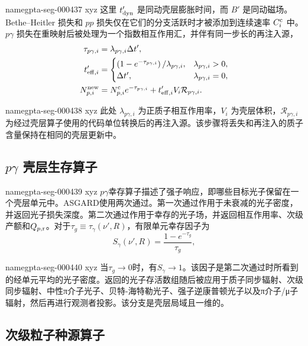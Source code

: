 \documentclass[twocolumn]{aastex702}
\makeatletter
\providecommand{\gptareaderanchor}[1]{\pdfdest name{#1} xyz}%
\providecommand{\gptareaderanchor}[1]{\special{pdf:dest (#1) [ @thispage /XYZ @xpos @ypos null ]}}%
\makeatother
\begin{document}
\gptareaderanchor{gpta-seg-000437}%
这里 \(t'_{\rm dyn}\) 是同动壳层膨胀时间，而 \(B'\) 是同动磁场。Bethe--Heitler 损失和 \(pp\) 损失仅在它们的分支活跃时才被添加到连续速率 \(C_i^{\rm c}\) 中。\(p\gamma\) 损失在重映射后被处理为一个指数相互作用汇，并伴有同一步长的再注入源，
\begin{equation}
\begin{aligned}
\tau_{p\gamma,i} &= \lambda_{p\gamma,i}\Delta t',\\
t'_{{\rm eff},i} &=
\begin{cases}
\left(1-e^{-\tau_{p\gamma,i}}\right)/\lambda_{p\gamma,i},
& \lambda_{p\gamma,i}>0,\\
\Delta t',&\lambda_{p\gamma,i}=0,
\end{cases}\\
N_{p,i}^{\rm new} &=
N_{p,i}^{\rm c}e^{-\tau_{p\gamma,i}}
+t'_{{\rm eff},i}V_i\mathcal{R}_{p\gamma,i}.
\end{aligned}
\end{equation}

\gptareaderanchor{gpta-seg-000438}%
此处 \(\lambda_{p\gamma,i}\) 为正质子相互作用率，\(V_i\) 为壳层体积，\(\mathcal{R}_{p\gamma,i}\) 为经过壳层算子使用的代码单位转换后的再注入源。该步骤将丢失和再注入的质子含量保持在相同的壳层更新中。

\subsection{\texorpdfstring{\(p\gamma\)}{p-gamma} 壳层生存算子}


\gptareaderanchor{gpta-seg-000439}%
\(p\gamma\)幸存算子描述了强子响应，即哪些目标光子保留在一个壳层单元中。ASGARD使用两次通过。第一次通过作用于未衰减的光子密度，并返回光子损失深度。第二次通过作用于幸存的光子场，并返回相互作用率、次级产额和\(Q_{p,{\rm r}}\)。对于\(\tau_g\equiv\tau_\gamma(\nu',R)\)，有限单元幸存因子为
\begin{equation}
S_\gamma(\nu',R)=
\frac{1-e^{-\tau_g}}{\tau_g},
\end{equation}

\gptareaderanchor{gpta-seg-000440}%
当\(\tau_g\rightarrow0\)时，有\(S_\gamma\rightarrow1\)。该因子是第二次通过时所看到的经单元平均的光子密度。返回的光子存活数组随后被应用于质子同步辐射、次级同步辐射、中性π介子光子、贝特-海特勒光子、强子逆康普顿光子以及π介子/μ子辐射，然后再进行观测者投影。该分支是壳层局域且一维的。

\subsection{次级粒子种源算子}
\end{document}
